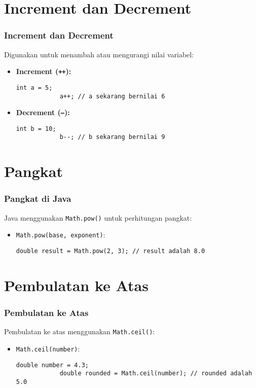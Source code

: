 \documentclass[aspectratio=169, table]{beamer}
\begin{document}
\section{Increment dan Decrement}
\begin{frame}[fragile]
	\frametitle{Increment dan Decrement}
	Digunakan untuk menambah atau mengurangi nilai variabel:
	\begin{itemize}
		\item \textbf{Increment (\texttt{++}):}
		\begin{lstlisting}[style=JavaStyle]
			int a = 5;
			a++; // a sekarang bernilai 6
		\end{lstlisting}
		\item \textbf{Decrement (\texttt{--}):}
		\begin{lstlisting}[style=JavaStyle]
			int b = 10;
			b--; // b sekarang bernilai 9
		\end{lstlisting}
	\end{itemize}
\end{frame}

\section{Pangkat}
\begin{frame}[fragile]
	\frametitle{Pangkat di Java}
	Java menggunakan \texttt{Math.pow()} untuk perhitungan pangkat:
	\begin{itemize}
		\item \texttt{Math.pow(base, exponent)}:
		\begin{lstlisting}[style=JavaStyle]
			double result = Math.pow(2, 3); // result adalah 8.0
		\end{lstlisting}
	\end{itemize}
\end{frame}

\section{Pembulatan ke Atas}
\begin{frame}[fragile]
	\frametitle{Pembulatan ke Atas}
	Pembulatan ke atas menggunakan \texttt{Math.ceil()}:
	\begin{itemize}
		\item \texttt{Math.ceil(number)}:
		\begin{lstlisting}[style=JavaStyle]
			double number = 4.3;
			double rounded = Math.ceil(number); // rounded adalah 5.0
		\end{lstlisting}
	\end{itemize}
\end{frame}
\end{document}
